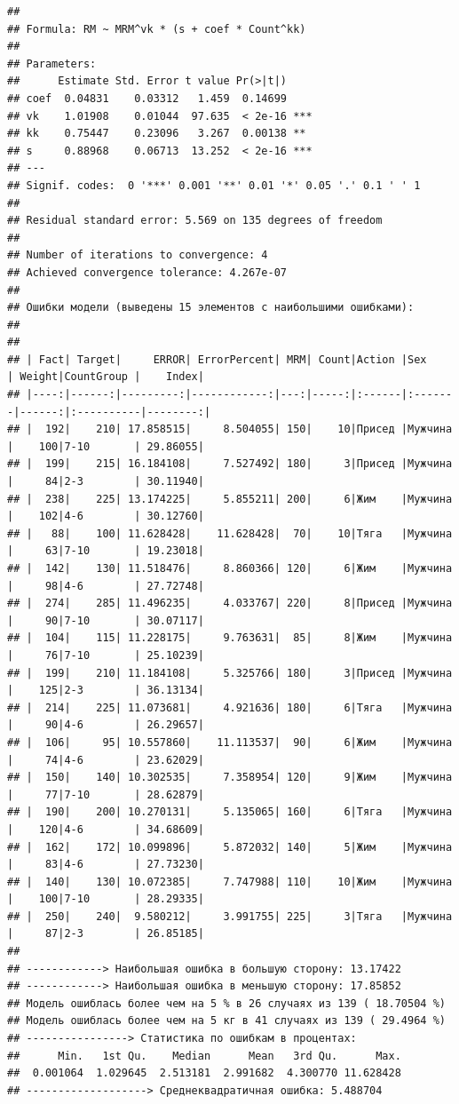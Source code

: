 \documentclass[
]{article}
\begin{document}
\begin{verbatim}
## 
## Formula: RM ~ MRM^vk * (s + coef * Count^kk)
## 
## Parameters:
##      Estimate Std. Error t value Pr(>|t|)    
## coef  0.04831    0.03312   1.459  0.14699    
## vk    1.01908    0.01044  97.635  < 2e-16 ***
## kk    0.75447    0.23096   3.267  0.00138 ** 
## s     0.88968    0.06713  13.252  < 2e-16 ***
## ---
## Signif. codes:  0 '***' 0.001 '**' 0.01 '*' 0.05 '.' 0.1 ' ' 1
## 
## Residual standard error: 5.569 on 135 degrees of freedom
## 
## Number of iterations to convergence: 4 
## Achieved convergence tolerance: 4.267e-07
## 
## Ошибки модели (выведены 15 элементов с наибольшими ошибками): 
## 
## 
## | Fact| Target|     ERROR| ErrorPercent| MRM| Count|Action |Sex     | Weight|CountGroup |    Index|
## |----:|------:|---------:|------------:|---:|-----:|:------|:-------|------:|:----------|--------:|
## |  192|    210| 17.858515|     8.504055| 150|    10|Присед |Мужчина |    100|7-10       | 29.86055|
## |  199|    215| 16.184108|     7.527492| 180|     3|Присед |Мужчина |     84|2-3        | 30.11940|
## |  238|    225| 13.174225|     5.855211| 200|     6|Жим    |Мужчина |    102|4-6        | 30.12760|
## |   88|    100| 11.628428|    11.628428|  70|    10|Тяга   |Мужчина |     63|7-10       | 19.23018|
## |  142|    130| 11.518476|     8.860366| 120|     6|Жим    |Мужчина |     98|4-6        | 27.72748|
## |  274|    285| 11.496235|     4.033767| 220|     8|Присед |Мужчина |     90|7-10       | 30.07117|
## |  104|    115| 11.228175|     9.763631|  85|     8|Жим    |Мужчина |     76|7-10       | 25.10239|
## |  199|    210| 11.184108|     5.325766| 180|     3|Присед |Мужчина |    125|2-3        | 36.13134|
## |  214|    225| 11.073681|     4.921636| 180|     6|Тяга   |Мужчина |     90|4-6        | 26.29657|
## |  106|     95| 10.557860|    11.113537|  90|     6|Жим    |Мужчина |     74|4-6        | 23.62029|
## |  150|    140| 10.302535|     7.358954| 120|     9|Жим    |Мужчина |     77|7-10       | 28.62879|
## |  190|    200| 10.270131|     5.135065| 160|     6|Тяга   |Мужчина |    120|4-6        | 34.68609|
## |  162|    172| 10.099896|     5.872032| 140|     5|Жим    |Мужчина |     83|4-6        | 27.73230|
## |  140|    130| 10.072385|     7.747988| 110|    10|Жим    |Мужчина |    100|7-10       | 28.29335|
## |  250|    240|  9.580212|     3.991755| 225|     3|Тяга   |Мужчина |     87|2-3        | 26.85185|
## 
## ------------> Наибольшая ошибка в большую сторону: 13.17422 
## ------------> Наибольшая ошибка в меньшую сторону: 17.85852 
## Модель ошиблась более чем на 5 % в 26 случаях из 139 ( 18.70504 %)
## Модель ошиблась более чем на 5 кг в 41 случаях из 139 ( 29.4964 %)
## ----------------> Статистика по ошибкам в процентах:
##      Min.   1st Qu.    Median      Mean   3rd Qu.      Max. 
##  0.001064  1.029645  2.513181  2.991682  4.300770 11.628428 
## -------------------> Среднеквадратичная ошибка: 5.488704
\end{verbatim}
\end{document}
